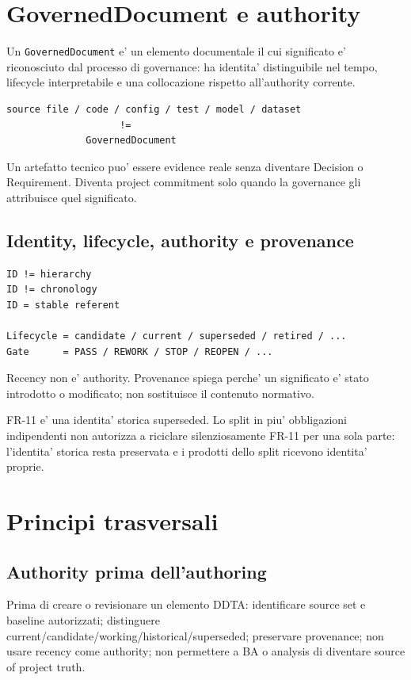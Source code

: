 \documentclass[11pt,a4paper]{article}
\begin{document}
\section{GovernedDocument e authority}
\closedtag

Un \texttt{GovernedDocument} e' un elemento documentale il cui significato e' riconosciuto dal processo di governance: ha identita' distinguibile nel tempo, lifecycle interpretabile e una collocazione rispetto all'authority corrente.

\begin{lstlisting}
source file / code / config / test / model / dataset
                    !=
              GovernedDocument
\end{lstlisting}

Un artefatto tecnico puo' essere evidence reale senza diventare Decision o Requirement. Diventa project commitment solo quando la governance gli attribuisce quel significato.

\subsection{Identity, lifecycle, authority e provenance}

\begin{lstlisting}
ID != hierarchy
ID != chronology
ID = stable referent

Lifecycle = candidate / current / superseded / retired / ...
Gate      = PASS / REWORK / STOP / REOPEN / ...
\end{lstlisting}

Recency non e' authority. Provenance spiega perche' un significato e' stato introdotto o modificato; non sostituisce il contenuto normativo.

\begin{ddtaexample}[title={DermaTriage FR-11}]
FR-11 e' una identita' storica superseded. Lo split in piu' obbligazioni indipendenti non autorizza a riciclare silenziosamente FR-11 per una sola parte: l'identita' storica resta preservata e i prodotti dello split ricevono identita' proprie.
\end{ddtaexample}

\section{Principi trasversali}

\subsection{Authority prima dell'authoring}
\closedtag
Prima di creare o revisionare un elemento DDTA: identificare source set e baseline autorizzati; distinguere current/candidate/working/historical/superseded; preservare provenance; non usare recency come authority; non permettere a BA o analysis di diventare source of project truth.
\end{document}
